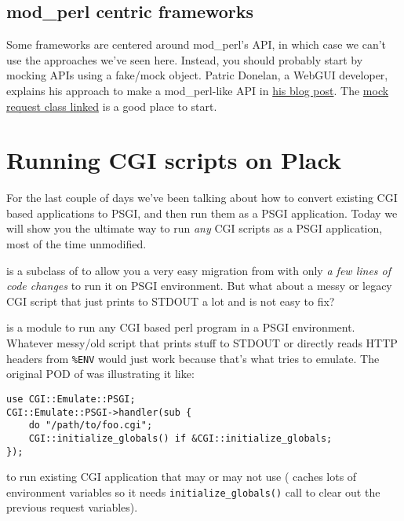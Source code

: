 \section{mod\_perl centric
frameworks}\label{modux5fperl-centric-frameworks}

Some frameworks are centered around mod\_perl's API, in which case we
can't use the approaches we've seen here. Instead, you should probably
start by mocking  APIs using a fake/mock object. Patric
Donelan, a WebGUI developer, explains his approach to make a
mod\_perl-like API in
\href{http://blog.patspam.com/2009/plack-roundup-at-sf-pm}{his blog
post}. The
\href{http://github.com/pdonelan/webgui/blob/plebgui/lib/WebGUI/Session/Plack.pm}{mock
request class linked} is a good place to start.

\chapter{Running CGI scripts on
Plack}\label{day-9-running-cgi-scripts-on-plack}

For the last couple of days we've been talking about how to convert
existing CGI based applications to PSGI, and then run them as a PSGI
application. Today we will show you the ultimate way to run \emph{any}
CGI scripts as a PSGI application, most of the time unmodified.

\href{http://search.cpan.org/perldoc?CGI::PSGI}{} is a subclass
of  to allow you a very easy migration from  with only
\emph{a few lines of code changes} to run it on PSGI environment. But
what about a messy or legacy CGI script that just prints to STDOUT a lot
and is not easy to fix?

\href{http://search.cpan.org/perldoc?CGI::Emulate::PSGI}{}
is a module to run any CGI based perl program in a PSGI environment.
Whatever messy/old script that prints stuff to STDOUT or directly reads
HTTP headers from \lstinline!%ENV! would just work because that's what
 tries to emulate. The original POD of
 was illustrating it like:

\begin{lstlisting}
use CGI::Emulate::PSGI;
CGI::Emulate::PSGI->handler(sub {
    do "/path/to/foo.cgi";
    CGI::initialize_globals() if &CGI::initialize_globals;
});
\end{lstlisting}
%
to run existing CGI application that may or may not use  (
caches lots of environment variables so it needs
\lstinline!initialize_globals()! call to clear out the previous request
variables).

